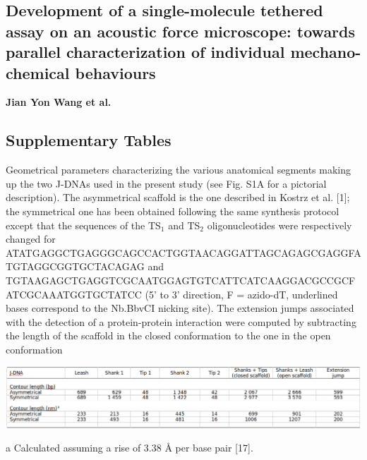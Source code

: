 \documentclass{biophys-new}
\begin{document}
\subsection*{Development of a single-molecule tethered assay on an acoustic force microscope: towards parallel characterization of individual mechano-chemical behaviours}

\textbf{ Jian Yon Wang et al.}


\setcounter{figure}{0}
\makeatletter 
\renewcommand{\thefigure}{S\@arabic\c@figure}
\makeatother
\setcounter{table}{0}
\makeatletter 
\renewcommand{\thetable}{S\@arabic\c@table}
\makeatother

\subsection*{Supplementary Tables}

\begin{table}[hbt!] %
	\caption{Geometrical parameters characterizing the various anatomical segments making up the two J-DNAs used in the present study (see Fig. S1A for a pictorial description). The asymmetrical scaffold is the one described in Kostrz et al. [1]; the symmetrical one has been obtained following the same synthesis protocol except that the sequences of the TS$_1$ and TS$_2$ oligonucleotides were respectively changed for
		ATATGAGGCTGAGGGCAGCCACTGGTAACAGGATTAGCAGAGCGAGGFATGTAGGCGGTGCTACAGAG
		and \\
		TGTAAGAGCTGAGGTCGCAATGGAGTGTCATTCATCAAGGACGCCGCFATCGCAAATGGTGCTATCC (5’ to 3’ direction, F = azido-dT, underlined bases correspond to the Nb.BbvCI nicking site). The extension jumps associated with the detection of a protein-protein interaction were computed by subtracting the length of the scaffold in the closed conformation to the one in the open conformation}
	\label{tbl:s1}
	\includegraphics[width=\linewidth]{Figures/TableS1.png}
\end{table}

\noindent
a Calculated assuming a rise of 3.38 Å per base pair [17].\\
\end{document}
